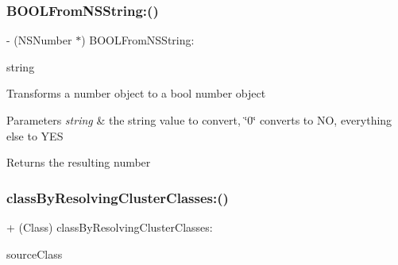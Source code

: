 \subsubsection{\texorpdfstring{B\+O\+O\+L\+From\+N\+S\+String\+:()}{BOOLFromNSString:()}}
{\footnotesize\ttfamily -\/ (N\+S\+Number $\ast$) B\+O\+O\+L\+From\+N\+S\+String\+: \begin{DoxyParamCaption}\item[{(N\+S\+String $\ast$)}]{string }\end{DoxyParamCaption}}

Transforms a number object to a bool number object 
\begin{DoxyParams}{Parameters}
{\em string} & the string value to convert, \char`\"{}0\char`\"{} converts to NO, everything else to Y\+ES \\
\hline
\end{DoxyParams}
\begin{DoxyReturn}{Returns}
the resulting number 
\end{DoxyReturn}
\mbox{\label{interface_o_p_t_l_y_j_s_o_n_value_transformer_affd96dfa59aa1a30e649c7bab538f2f7}} 
\subsubsection{\texorpdfstring{class\+By\+Resolving\+Cluster\+Classes\+:()}{classByResolvingClusterClasses:()}}
{\footnotesize\ttfamily + (Class) class\+By\+Resolving\+Cluster\+Classes\+: \begin{DoxyParamCaption}\item[{(Class)}]{source\+Class }\end{DoxyParamCaption}}

